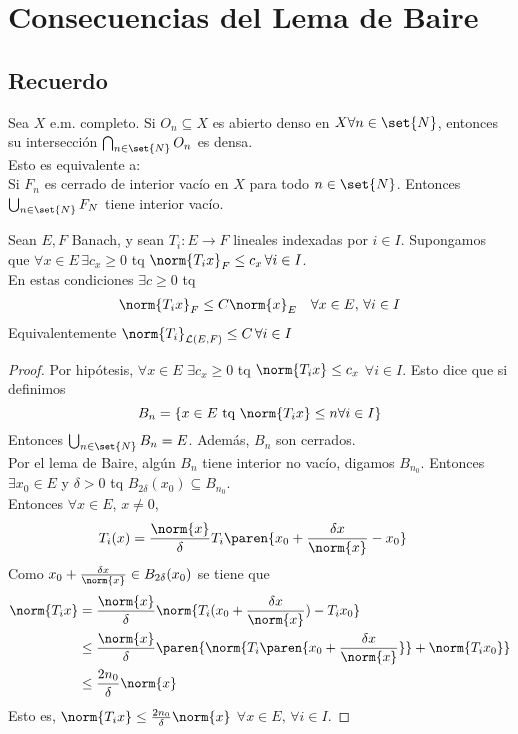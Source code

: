 \documentclass{notetaking}
\begin{document}
\section{Consecuencias del Lema de Baire}
\subsection{Recuerdo}
Sea \(X\) e.m. completo. Si \(O_n\subseteq X\) es abierto denso en \(X\forall n\in\set{N}\), entonces su intersección \(\bigcap_{n\in\set{N}}O_n\) es densa.\\
Esto es equivalente a:\\
Si \(F_n\) es cerrado de interior vacío en \(X\) para todo \(n\in\set{N}\). Entonces \(\bigcup_{n\in\set{N}}F_N\) tiene interior vacío.

\begin{thm}
    Sean \(E,F\) Banach, y sean \(T_i:E\rightarrow F\) lineales indexadas por \(i\in I\). Supongamos que \(\forall x\in E\,\exists c_x\geq 0\) tq \(\norm{T_ix}_F\leq c_x\,\forall i\in I\).\\
    En estas condiciones \(\exists c\geq 0\) tq
    \begin{align*}
         & \norm{T_ix}_F\leq C\norm{x}_E & \forall x\in E,\,\forall i\in I
    \end{align*}
    Equivalentemente \(\norm{T_i}_{\mathcal{L}(E,F)}\leq C\,\forall i\in I\)
\end{thm}
\begin{proof}
    Por hipótesis, \(\forall x\in E\) \(\exists c_x\geq 0\) tq \(\norm{T_ix}\leq c_x\) \(\forall i\in I\). Esto dice que si definimos
    \[
        B_n=\{x\in E\text{ tq }\norm{T_ix}\leq n\forall i\in I\}
    \]
    Entonces \(\bigcup_{n\in\set{N}}B_n=E\). Además, \(B_n\) son cerrados.\\
    Por el lema de Baire, algún \(B_n\) tiene interior no vacío, digamos \(B_{n_0}\). Entonces \(\exists x_0\in E\) y \(\delta>0\) tq \(B_{2\delta}(x_0)\subseteq B_{n_0}\).\\
    Entonces \(\forall x\in E\), \(x\neq0\),
    \begin{align*}
        T_i(x) & =\frac{\norm{x}}\delta T_i\paren{x_0+\frac{\delta x}{\norm{x}}-x_0}
    \end{align*}
    Como \(x_0+\frac{\delta x}{\norm{x}}\in B_{2\delta}(x_0)\) se tiene que
    \begin{align*}
        \norm{T_ix} & =\frac{\norm{x}}\delta\norm{T_i(x_0+\frac{\delta x}{\norm{x}})-T_ix_0}                         \\
                    & \leq\frac{\norm{x}}\delta\paren{\norm{T_i\paren{x_0+\frac{\delta x}{\norm{x}}}}+\norm{T_ix_0}} \\
                    & \leq\frac{2n_0}\delta\norm{x}
    \end{align*}
    Esto es, \(\norm{T_ix}\leq\frac{2n_0}\delta\norm{x}\) \(\forall x\in E,\,\forall i\in I\).
\end{proof}
\end{document}

